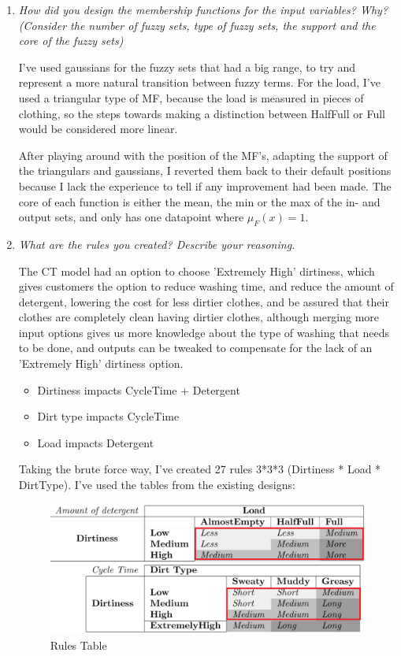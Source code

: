 \documentclass[11pt]{article}
\begin{document}
\begin{enumerate}[label=(\alph*)]
  \item \textit{How did you design the membership functions for the input
  variables? Why? (Consider the number of fuzzy sets, type of fuzzy sets, the
  support and the core of the fuzzy sets)}

  I've used gaussians for the fuzzy sets that had a big range, to try and
  represent a more natural transition between fuzzy terms. For the load, I've
  used a triangular type of MF, because the load is measured in pieces of
  clothing, so the steps towards making a distinction between HalfFull or Full
  would be considered more linear.

  After playing around with the position of the MF's, adapting the support of
  the triangulars and gaussians, I reverted them back to their default
  positions because I lack the experience to tell if any improvement had been
  made. The core of each function is either the mean, the min or the max of the
  in- and output sets, and only has one datapoint where $\mu_F(x)=1$.

  \item \textit{What are the rules you created? Describe your reasoning.}

  The CT model had an option to choose 'Extremely High' dirtiness,
  which gives customers the option to reduce washing time, and reduce the amount
  of detergent, lowering the cost for less dirtier clothes, and be assured that
  their clothes are completely clean having dirtier clothes, although merging
  more input options gives us more knowledge about the type of washing that
  needs to be done, and outputs can be tweaked to compensate for the lack of an
  'Extremely High' dirtiness option.

  \begin{itemize}[noitemsep]
  \item Dirtiness impacts CycleTime + Detergent
  \item Dirt type impacts CycleTime
  \item Load impacts Detergent
  \end{itemize}

  Taking the brute force way, I've created 27 rules 3*3*3 (Dirtiness * Load *
  DirtType). I've used the tables from the existing designs:

  \begin{figure}[ht!]
    \centering
    \includegraphics[width=0.9\linewidth]{res/rules_table}
    \caption{Rules Table}
  \end{figure}


\end{enumerate}
\end{document}
